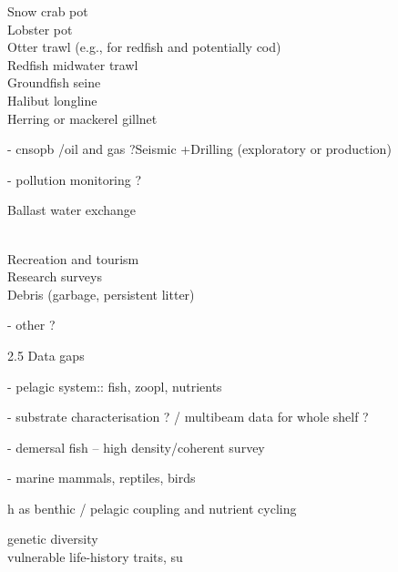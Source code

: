 \documentclass[letterpaper,portrait,12pt]{scrartcl}
\numberwithin{equation}{section}		%
\numberwithin{figure}{section}			%
\numberwithin{table}{section}				%
\begin{document}
\begin{flushleft}

	Snow crab pot\\Lobster pot\\Otter trawl (e.g., for redfish and potentially cod)\\Redfish midwater trawl\\Groundfish seine\\Halibut longline\\Herring or mackerel gillnet 

\end{flushleft}



- cnsopb /oil and gas ?Seismic +Drilling (exploratory or production) 




- pollution monitoring ?




Ballast water exchange 




\\Recreation and tourism\\Research surveys\\Debris (garbage, persistent litter) 




- other ?









2.5  Data gaps









- pelagic system:: fish, zoopl, nutrients 




- substrate characterisation ?  / multibeam data for whole shelf ?




- demersal fish -- high density/coherent survey




- marine mammals, reptiles, birds




h as benthic / pelagic coupling and nutrient cycling




genetic diversity \\vulnerable life-history traits, su
\end{document}
